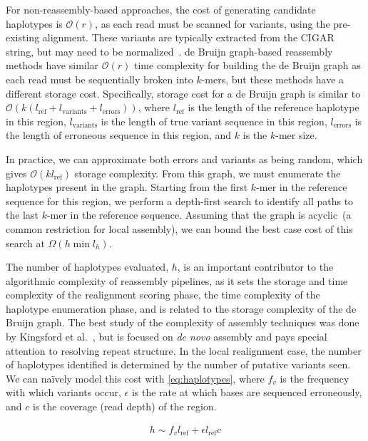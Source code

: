 \documentclass[phd]{ucbthesis}
\begin{document}
For non-reassembly-based approaches, the cost of generating candidate haplotypes is $\mathcal{O}(r)$,
as each read must be scanned for variants, using the pre-existing alignment. These variants are typically
extracted from the CIGAR string, but may need to be normalized~\cite{li14}. de Bruijn graph-based 
reassembly methods have similar $\mathcal{O}(r)$ time complexity for building the de Bruijn
graph as each read must be sequentially broken into $k$-mers, but these methods have a different
storage cost. Specifically, storage cost for a de Bruijn graph is similar to $\mathcal{O}(k
(l_{\text{ref}} + l_{\text{variants}} + l_{\text{errors}}))$, where $l_{\text{ref}}$ is the length of the reference
haplotype in this region, $l_{\text{variants}}$ is the length of true variant sequence in this region, 
$l_{\text{errors}}$ is the length of erroneous sequence in this region, and $k$ is the $k$-mer size.

In practice, we can approximate both errors and variants as being random, which gives $\mathcal{O}(k
l_{\text{ref}})$ storage complexity. From this graph, we must enumerate the haplotypes present in the
graph. Starting from the first $k$-mer in the reference sequence for this region, we perform a depth-first
search to identify all paths to the last $k$-mer in the reference sequence. Assuming that the graph is
acyclic~(a common restriction for local assembly), we can
bound the best case cost of this search at $\Omega(h \min l_h)$.

The number of haplotypes evaluated, $h$, is an important contributor to the algorithmic complexity of
reassembly pipelines, as it sets the storage and time complexity of the realignment scoring phase, the
time complexity of the haplotype enumeration phase, and is related to the storage complexity of the
de Bruijn graph. The best study of the complexity of assembly techniques was done by Kingsford
et al.~\cite{kingsford10}, but is focused on \emph{de novo} assembly and pays special attention to
resolving repeat structure. In the local realignment case, the number of haplotypes identified is determined
by the number of putative variants seen. We can na\"{i}vely model this cost with \eqref{eq:haplotypes},
where $f_v$ is the frequency with which variants occur, $\epsilon$ is the rate at which bases are
sequenced erroneously, and $c$ is the coverage (read depth) of the region.

\begin{align}
\label{eq:haplotypes}
h \sim f_v l_{\text{ref}} + \epsilon l_{\text{ref}} c
\end{align}
\end{document}

